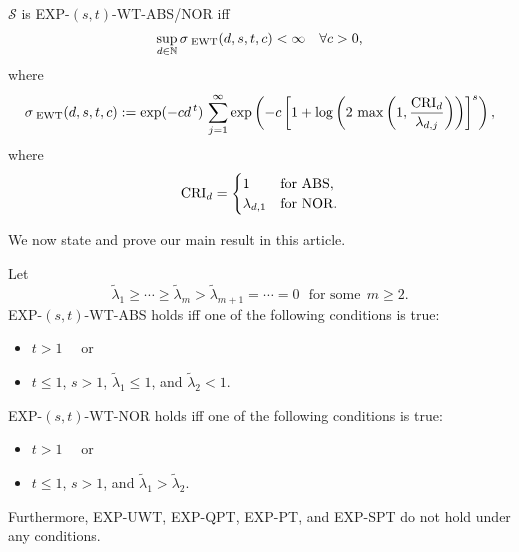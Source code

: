 \documentclass[graybox]{svmult}
\newcommand{\tlambda}{\widetilde{\lambda}}
\newcommand{\SEWT}{\sigma_{\;\textup{EWT}}}
\newcommand{\EXP}{\textup{EXP}\xspace}
\newcommand{\NOR}{\textup{NOR}\xspace}
\newcommand{\ABS}{\textup{ABS}\xspace}
\newcommand{\SPT}{\textup{SPT}\xspace}
\newcommand{\PT}{\textup{PT}\xspace}
\newcommand{\QPT}{\textup{QPT}\xspace}
\newcommand{\WT}{\textup{WT}\xspace}
\newcommand{\UWT}{\textup{UWT}\xspace}
\newcommand{\calS}{{\mathcal{S}}}
\newcommand{\N}{{\mathbb{N}}} %
\begin{document}
\begin{theorem} \cite{KW18} \label{thm:general}   
$\calS$ is \EXP-$(s,t)$-\WT-\ABS/\NOR iff   
\begin{equation}\label{eq:EXP-WT}   
\sup_{d\in\N} \SEWT (d,s,t,c)    
 < \infty\quad \forall c>0,   
\end{equation}   
where   
\[   
 \SEWT (d,s,t,c):=\exp (-cd^{\,t})\,\sum_{j=1}^\infty    
\exp \left(-c \left[   
1+   
\log\left(2\,\max\left(1,\frac{{\rm   
        CRI}_d}{\lambda_{d,j}}\right)\right)   
\right]^s \right),   
\]   
where 
$$   
 \mathrm{CRI}_d=\begin{cases}   
                 1 &\mbox{for $\ABS$},\\   
                 \lambda_{d,1} &\mbox{for $\NOR$}.   
                 \end{cases}   
$$  
\end{theorem}   



We now state and prove our main result in this article.
\begin{theorem}\label{thm:main}
Let
$$
\tlambda_1\ge\cdots\ge\tlambda_m>\tlambda_{m+1}=\cdots=0\ \ \
\mbox{for some}\ \ m\ge2.
$$
\EXP-$(s,t)$-\WT-\ABS holds iff one of the following conditions is true:
\begin{itemize}
\item $t>1$ \ \ \mbox{or}
\item $t\le 1$, $s>1$, $\tlambda_1\le1$, and $\tlambda_2<1$.
\end{itemize}
\EXP-$(s,t)$-\WT-\NOR holds iff one of the following conditions is true:
\begin{itemize}
\item $t>1$ \ \ \mbox{or}
\item $t\le 1$, $s>1$, and $\tlambda_1>\tlambda_2$.
\end{itemize}
Furthermore, \EXP-\UWT, \EXP-\QPT, \EXP-\PT, and \EXP-\SPT do not hold under any conditions.

\end{theorem}
\end{document}
